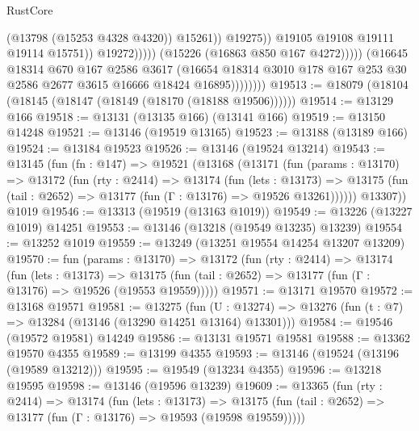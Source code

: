 \begin{lexlean}{RustCore}
\begin{coremodule}
                                            (@13798 (@15253 @4328 @4320))
                                            @15261))
                                        @19275))
                                    @19105
                                    @19108
                                    @19111
                                    @19114
                                    @15751))
                                @19272)))))
                      (@15226 (@16863 @850 @167 @4272)))))
                (@16645
                  @18314
                  @670
                  @167
                  @2586
                  @3617
                  (@16654
                    @18314
                    @3010
                    @178
                    @167
                    @253
                    @30
                    @2586
                    @2677
                    @3615
                    @16666
                    @18424
                    @16895))))))))
@19513 := @18079 (@18104 (@18145 (@18147 (@18149 (@18170 (@18188 @19506))))))
@19514 := @13129 @166
@19518 := @13131 (@13135 @166) (@13141 @166)
@19519 := @13150 @14248
@19521 := @13146 (@19519 @13165)
@19523 := @13188 (@13189 @166)
@19524 := @13184 @19523
@19526 := @13146 (@19524 @13214)
@19543 := @13145
    (fun (fn : @147) =>
    @19521
      (@13168
        (@13171
          (fun (params : @13170) =>
          @13172
            (fun (rty : @2414) =>
            @13174
              (fun (lets : @13173) =>
              @13175 (fun (tail : @2652) => @13177 (fun (Γ : @13176) => @19526 @13261))))))
        @13307))
    @1019
@19546 := @13313 (@19519 (@13163 @1019))
@19549 := @13226 (@13227 @1019) @14251
@19553 := @13146 (@13218 (@19549 @13235) @13239)
@19554 := @13252 @1019
@19559 := @13249 (@13251 @19554 @14254 @13207 @13209)
@19570 := fun (params : @13170) =>
  @13172
    (fun (rty : @2414) =>
    @13174
      (fun (lets : @13173) =>
      @13175 (fun (tail : @2652) => @13177 (fun (Γ : @13176) => @19526 (@19553 @19559)))))
@19571 := @13171 @19570
@19572 := @13168 @19571
@19581 := @13275
    (fun (U : @13274) => @13276 (fun (t : @7) => @13284 (@13146 (@13290 @14251 @13164) @13301)))
@19584 := @19546 (@19572 @19581) @14249
@19586 := @13131 @19571 @19581
@19588 := @13362 @19570 @4355
@19589 := @13199 @4355
@19593 := @13146 (@19524 (@13196 (@19589 @13212)))
@19595 := @19549 (@13234 @4355)
@19596 := @13218 @19595
@19598 := @13146 (@19596 @13239)
@19609 := @13365
    (fun (rty : @2414) =>
    @13174
      (fun (lets : @13173) =>
      @13175 (fun (tail : @2652) => @13177 (fun (Γ : @13176) => @19593 (@19598 @19559)))))

\end{coremodule}
\end{lexlean}
